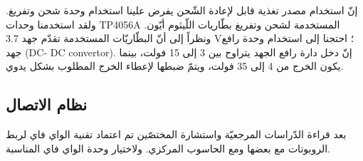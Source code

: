 إنّ استخدام مصدر تغذية قابل لإعادة الشّحن يفرض علينا استخدام وحدة شحن وتفريغ. ولقد استخدمنا وحدات TP4056A المستخدمة لشحن وتفريغ بطّاريات اللّيثوم أيّون. ونظراً إلى أنّ البطّاريّات المستخدمة تقدّم جهد 3.7 V؛ احتجنا إلى استخدام وحدة رافع جهد (DC- DC convertor). إنّ دخل دارة رافع الجهد يتراوح بين 3 إلى 15 فولت، بينما يكون الخرج من 4 إلى 35 فولت، ويتمّ ضبطها لإعطاء الخرج المطلوب بشكل يدوي.


\subsection{نظام الاتصال}
بعد قراءة الدّراسات المرجعيّة واستشارة المختصّين تم اعتماد تقنية الواي فاي لربط الروبوتات مع بعضها ومع الحاسوب المركزي. ولاختيار وحدة الواي فاي المناسبة.
